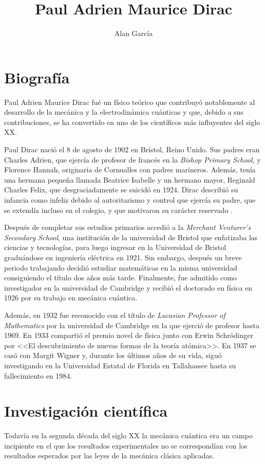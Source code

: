 \title{Paul Adrien Maurice Dirac}
\author{Alan García}


\maketitle \newpage

\section{Biografía}
Paul Adrien Maurice Dirac fué un físico teórico que contribuyó notablemente al desarrollo de la mecánica y la electrodinámica cuánticas y que, debido a sus contribuciones, se ha convertido en uno de los científicos más influyentes del siglo XX. 

Paul Dirac nació el 8 de agosto de 1902 en Brístol, Reino Unido. Sus padres eran Charles Adrien, que ejercía de profesor de francés en la \textit{Bishop Primary School}, y Florence Hannah, originaria de Cornualles con padres marineros. Además, tenía una hermana pequeña llamada Beatrice Isabelle y un hermano mayor, Reginald Charles Felix, que desgraciadamente se suicidó en 1924. Dirac describió su infancia como infeliz debido al autoritarismo y control que ejercía su padre, que se extendía incluso en el colegio, y que motivaron su carácter reservado \cite{RefWorks:farmelo2009strangest}.

Después de completar sus estudios primarios accedió a la \textit{Merchant Venturer’s Secondary School}, una institución de la universidad de Bristol que enfatizaba las ciencias y tecnologías, para luego ingresar en la Universidad de Bristol graduándose en ingeniería eléctrica en 1921. Sin embargo, después un breve periodo trabajando decidió estudiar matemáticas en la misma universidad consiguiendo el título dos años más tarde. Finalmente, fue admitido como investigador en la universidad de Cambridge y recibió el doctorado en física en 1926 por su trabajo en mecánica cuántica. 

Además, en 1932 fue reconocido con el título de \textit{Lucasian Professor of Mathematics} por la universidad de Cambridge en la que ejerció de profesor hasta 1969. En 1933 compartió el premio novel de física junto con Erwin Schrödinger por <<El descubrimiento de nuevas formas de la teoría atómica>>. En 1937 se casó con Margit Wigner y, durante los últimos años de su vida, siguó investigando en la Universidad Estatal de Florida en Tallahassee hasta su fallecimiento en 1984.

\section{Investigación científica}
Todavía en la segunda década del siglo XX la mecánica cuántica era un campo incipiente en el que los resultados experimentales no se correspondían con los resultados esperados por las leyes de la mecánica clásica aplicadas. 

